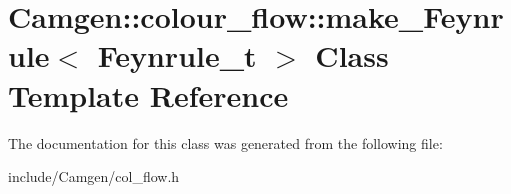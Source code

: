 \hypertarget{a00341}{\section{Camgen\-:\-:colour\-\_\-flow\-:\-:make\-\_\-\-Feynrule$<$ Feynrule\-\_\-t $>$ Class Template Reference}
\label{a00341}
}


The documentation for this class was generated from the following file\-:\begin{DoxyCompactItemize}
\item 
include/\-Camgen/col\-\_\-flow.\-h\end{DoxyCompactItemize}
